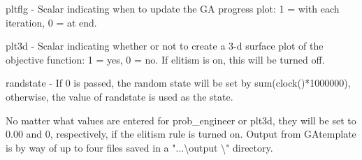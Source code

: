 \documentclass{book}
\newcommand{\textcode}[1]{\textsf{\small #1}}   %
\begin{document}
\begin{compactitem}
\item \textcode{pltflg} - Scalar indicating when to update the GA progress plot: 1 = with each iteration, 0 = at end.

\item \textcode{plt3d} - Scalar indicating whether or not to create a 3-d surface plot of the objective function: 1 = yes, 0 = no. If \textcode{elitism} is on, this will be turned off.

\item \textcode{randstate} - If 0 is passed, the random state will be set by \textcode{sum(clock()*1000000)}, otherwise, the value of randstate is used as the state.

\end{compactitem}

No matter what values are entered for \textcode{prob\_engineer}
or \textcode{plt3d}, they will be set to $0.00$ and $0$,
respectively, if the elitism rule is turned on. Output from
\textcode{GAtemplate} is by way of up to four files saved in a
"...\textbackslash output \textbackslash" directory.
\end{document}
